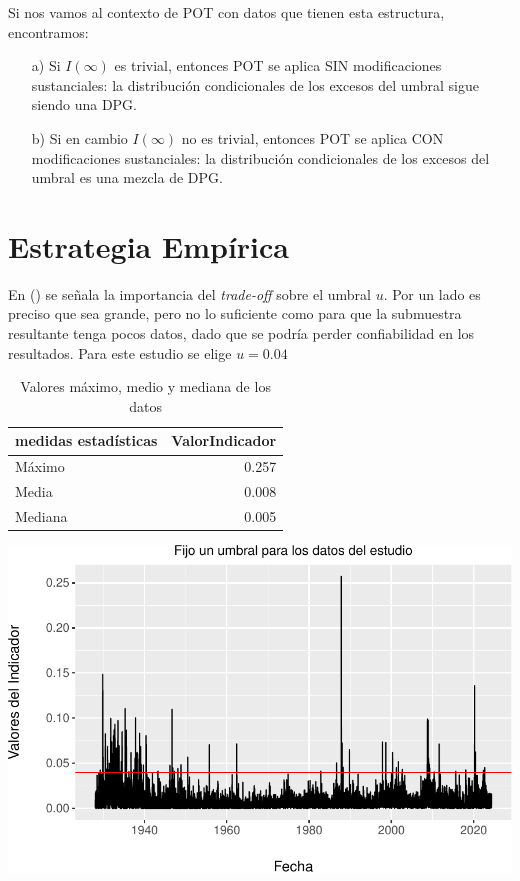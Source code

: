 \documentclass[
  12pt]{article}
\begin{document}
Si nos vamos al contexto de POT con datos que tienen esta estructura,
encontramos:

\begin{itemize}
\item[a)] Si $I(\infty)$ es trivial, entonces POT se aplica SIN modificaciones sustanciales: la distribución condicionales de los excesos del umbral sigue siendo una DPG.
\item[b)] Si en cambio $I(\infty)$ no es trivial, entonces POT se aplica CON modificaciones sustanciales: la distribución condicionales de los excesos del umbral es una mezcla de DPG.
\end{itemize}

\newpage

\section{Estrategia Empírica}

En () se señala la importancia del
\textit{trade-off} sobre el umbral \(u\). Por un lado es preciso que sea
grande, pero no lo suficiente como para que la submuestra resultante
tenga pocos datos, dado que se podría perder confiabilidad en los
resultados. Para este estudio se elige \(u=0.04\)

\begin{table}[ht]
\centering
\begin{tabular}{lr}
  \hline
medidas estadísticas & ValorIndicador \\ 
  \hline
Máximo & 0.257 \\ 
  Media & 0.008 \\ 
  Mediana & 0.005 \\ 
   \hline
\end{tabular}
\caption{Valores máximo, medio y mediana de los datos} 
\label{tabla_1}
\end{table}

\includegraphics{Entrega_files/figure-latex/unnamed-chunk-21-1.pdf}
\end{document}

